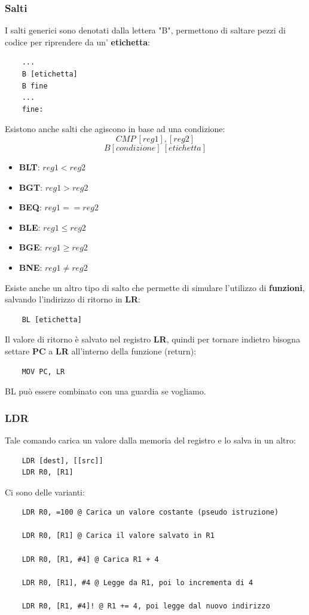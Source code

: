 \documentclass[12pt,a4paper]{article}
\begin{document}
\subsubsection{Salti}
I salti generici sono denotati dalla lettera "B", permettono di saltare pezzi di codice per riprendere da un' \textbf{etichetta}:
\begin{lstlisting}
    ...
    B [etichetta]
    B fine
    ...
    fine:
\end{lstlisting}
Esistono anche salti che agiscono in base ad una condizione:
\[
CMP\ [reg1], [reg2]
\]
\[
B[condizione]\ [etichetta]
\]
\begin{itemize}
    \item \textbf{BLT}: $reg1 < reg2$
    \item \textbf{BGT}: $reg1 > reg2$
    \item \textbf{BEQ}: $reg1 == reg2$
    \item \textbf{BLE}: $reg1 \leq reg2$
    \item \textbf{BGE}: $reg1 \geq reg2$
    \item \textbf{BNE}: $reg1 \ne reg2$
\end{itemize}
Esiste anche un altro tipo di salto che permette di simulare l'utilizzo di \textbf{funzioni}, salvando l'indirizzo di ritorno in \textbf{LR}:
\begin{lstlisting}
    BL [etichetta]
\end{lstlisting}
Il valore di ritorno è salvato nel registro \textbf{LR}, quindi per tornare indietro bisogna settare \textbf{PC} a \textbf{LR} all'interno della funzione (return):
\begin{lstlisting}
    MOV PC, LR
\end{lstlisting}
BL può essere combinato con una guardia se vogliamo.

\subsubsection{LDR} 
Tale comando carica un valore dalla memoria del registro e lo salva in un altro:
\begin{lstlisting}
    LDR [dest], [[src]]
    LDR R0, [R1]
\end{lstlisting}
Ci sono delle varianti:
\begin{lstlisting}
    LDR R0, =100 @ Carica un valore costante (pseudo istruzione)
    
    LDR R0, [R1] @ Carica il valore salvato in R1

    LDR R0, [R1, #4] @ Carica R1 + 4

    LDR R0, [R1], #4 @ Legge da R1, poi lo incrementa di 4
    
    LDR R0, [R1, #4]! @ R1 += 4, poi legge dal nuovo indirizzo
\end{lstlisting}
\end{document}
